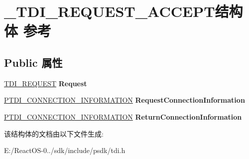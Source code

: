 \hypertarget{struct___t_d_i___r_e_q_u_e_s_t___a_c_c_e_p_t}{}\section{\+\_\+\+T\+D\+I\+\_\+\+R\+E\+Q\+U\+E\+S\+T\+\_\+\+A\+C\+C\+E\+P\+T结构体 参考}
\label{struct___t_d_i___r_e_q_u_e_s_t___a_c_c_e_p_t}
\subsection*{Public 属性}
\begin{DoxyCompactItemize}
\item 
\mbox{\label{struct___t_d_i___r_e_q_u_e_s_t___a_c_c_e_p_t_ac74b943a4fd09329f375369f896eeddf}} 
\hyperlink{struct___t_d_i___r_e_q_u_e_s_t}{T\+D\+I\+\_\+\+R\+E\+Q\+U\+E\+ST} {\bfseries Request}
\item 
\mbox{\label{struct___t_d_i___r_e_q_u_e_s_t___a_c_c_e_p_t_a30b718e249a18ced60c93a51a24d8523}} 
\hyperlink{struct___t_d_i___c_o_n_n_e_c_t_i_o_n___i_n_f_o_r_m_a_t_i_o_n}{P\+T\+D\+I\+\_\+\+C\+O\+N\+N\+E\+C\+T\+I\+O\+N\+\_\+\+I\+N\+F\+O\+R\+M\+A\+T\+I\+ON} {\bfseries Request\+Connection\+Information}
\item 
\mbox{\label{struct___t_d_i___r_e_q_u_e_s_t___a_c_c_e_p_t_a2cdf059ccdabee01efce388b70dcf2c4}} 
\hyperlink{struct___t_d_i___c_o_n_n_e_c_t_i_o_n___i_n_f_o_r_m_a_t_i_o_n}{P\+T\+D\+I\+\_\+\+C\+O\+N\+N\+E\+C\+T\+I\+O\+N\+\_\+\+I\+N\+F\+O\+R\+M\+A\+T\+I\+ON} {\bfseries Return\+Connection\+Information}
\end{DoxyCompactItemize}


该结构体的文档由以下文件生成\+:\begin{DoxyCompactItemize}
\item 
E\+:/\+React\+O\+S-\/0../sdk/include/psdk/tdi.\+h\end{DoxyCompactItemize}
